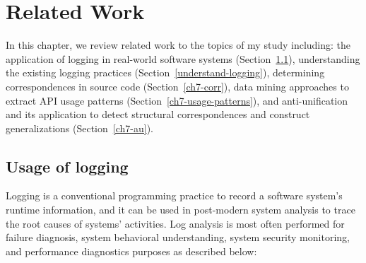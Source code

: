 \chapter{Related Work}  \label{rw}
In this chapter, we review related work to the topics of my study including: the application of logging in real-world software systems (Section~\ref{logging}), understanding the existing logging practices (Section~\ref{understand-logging}),
 determining correspondences in source code (Section~\ref{ch7-corr}), data mining approaches to extract API usage patterns (Section~\ref{ch7-usage-patterns}), and anti-unification and its application to detect structural correspondences and construct generalizations (Section~\ref{ch7-au}). %
\section{Usage of logging}  \label{logging}
Logging is a conventional programming practice to record a software system's runtime information, and it can be used in post-modern system analysis to trace the root causes of systems' activities. Log analysis is most often performed for failure diagnosis, system behavioral understanding, system security monitoring, and performance diagnostics purposes as described below:
